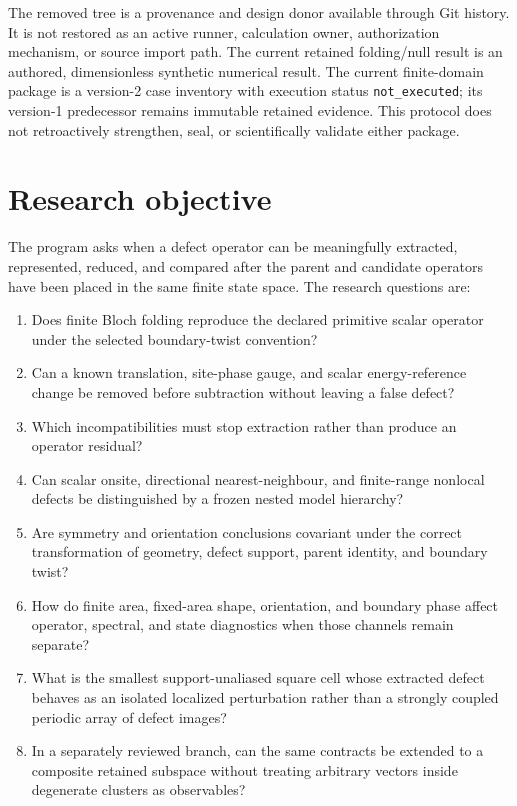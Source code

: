 \documentclass[11pt]{article}
\begin{document}
The removed  tree is a
provenance and design donor available through Git history.  It is not restored as an
active runner, calculation owner, authorization mechanism, or source import path.
The current retained folding/null result is an authored, dimensionless synthetic
numerical result.  The current finite-domain package is a version-2 case inventory with execution status
\texttt{not\_executed}; its version-1 predecessor remains immutable retained evidence.  This protocol does not retroactively strengthen, seal, or
scientifically validate either package.

\section{Research objective}

The program asks when a defect operator can be meaningfully extracted, represented,
reduced, and compared after the parent and candidate operators have been placed in the
same finite state space.  The research questions are:

\begin{enumerate}[leftmargin=*]
  \item Does finite Bloch folding reproduce the declared primitive scalar operator
    under the selected boundary-twist convention?
  \item Can a known translation, site-phase gauge, and scalar energy-reference change
    be removed before subtraction without leaving a false defect?
  \item Which incompatibilities must stop extraction rather than produce an operator
    residual?
  \item Can scalar onsite, directional nearest-neighbour, and finite-range nonlocal
    defects be distinguished by a frozen nested model hierarchy?
  \item Are symmetry and orientation conclusions covariant under the correct
    transformation of geometry, defect support, parent identity, and boundary twist?
  \item How do finite area, fixed-area shape, orientation, and boundary phase affect
    operator, spectral, and state diagnostics when those channels remain separate?
  \item What is the smallest support-unaliased square cell whose extracted defect
    behaves as an isolated localized perturbation rather than a strongly coupled
    periodic array of defect images?
  \item In a separately reviewed branch, can the same contracts be extended to a
    composite retained subspace without treating arbitrary vectors inside degenerate
    clusters as observables?
\end{enumerate}
\end{document}
